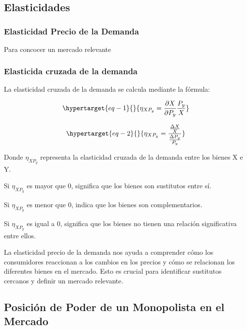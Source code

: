 \documentclass[
  a4paper,
]{article}
\theoremstyle{definition}
\theoremstyle{remark}
\begin{document}
\hypertarget{elasticidades}{%
\subsection{Elasticidades}\label{elasticidades}}

\hypertarget{elasticidad-precio-de-la-demanda}{%
\subsubsection{Elasticidad Precio de la
Demanda}\label{elasticidad-precio-de-la-demanda}}

Para concocer un mercado relevante

\hypertarget{elasticida-cruzada-de-la-demanda}{%
\subsubsection{Elasticida cruzada de la
demanda}\label{elasticida-cruzada-de-la-demanda}}

La elasticidad cruzada de la demanda se calcula mediante la fórmula:

\begin{equation}\protect\hypertarget{eq-1}{}{
\eta_{XP_{y}} = \frac{\partial X}{\partial P_{y}} \frac{P_{y}}{X}
}\label{eq-1}\end{equation}

\begin{equation}\protect\hypertarget{eq-2}{}{
\eta_{XP_{y}} = \frac{\frac{\Delta X}{X}}{\frac{\Delta P_{y}}{P_{y}}}
}\label{eq-2}\end{equation}

Donde \(\eta_{XP_y}\) representa la elasticidad cruzada de la demanda
entre los bienes X e Y.

Si \(\eta_{XP_y}\) es mayor que 0, significa que los bienes son
sustitutos entre sí.

Si \(\eta_{XP_y}\) es menor que 0, indica que los bienes son
complementarios.

Si \(\eta_{XP_y}\) es igual a 0, significa que los bienes no tienen una
relación significativa entre ellos.

La elasticidad precio de la demanda nos ayuda a comprender cómo los
consumidores reaccionan a los cambios en los precios y cómo se
relacionan los diferentes bienes en el mercado. Esto es crucial para
identificar sustitutos cercanos y definir un mercado relevante.

\hypertarget{posiciuxf3n-de-poder-de-un-monopolista-en-el-mercado}{%
\subsection{Posición de Poder de un Monopolista en el
Mercado}\label{posiciuxf3n-de-poder-de-un-monopolista-en-el-mercado}}
\end{document}
